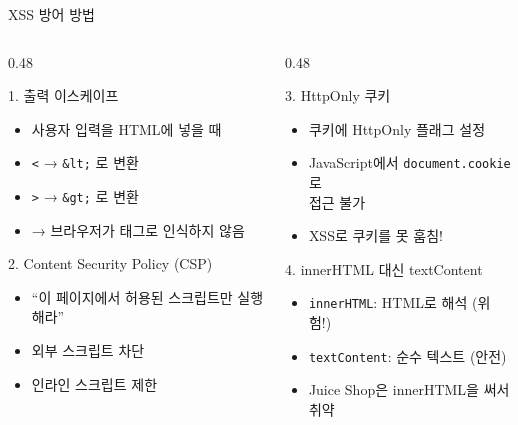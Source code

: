 \documentclass[aspectratio=169,10pt]{beamer}
\begin{document}
\begin{frame}{XSS 방어 방법}

\begin{columns}[T]
\begin{column}{0.48\textwidth}
\begin{block}{1. 출력 이스케이프}
\begin{itemize}
    \item 사용자 입력을 HTML에 넣을 때
    \item \texttt{<} → \texttt{\&lt;} 로 변환
    \item \texttt{>} → \texttt{\&gt;} 로 변환
    \item → 브라우저가 태그로 인식하지 않음
\end{itemize}
\end{block}
\vspace{0.3em}
\begin{block}{2. Content Security Policy (CSP)}
\begin{itemize}
    \item ``이 페이지에서 허용된 스크립트만 실행해라''
    \item 외부 스크립트 차단
    \item 인라인 스크립트 제한
\end{itemize}
\end{block}
\end{column}
\begin{column}{0.48\textwidth}
\begin{block}{3. HttpOnly 쿠키}
\begin{itemize}
    \item 쿠키에 HttpOnly 플래그 설정
    \item JavaScript에서 \texttt{document.cookie}로\\접근 불가
    \item XSS로 쿠키를 못 훔침!
\end{itemize}
\end{block}
\vspace{0.3em}
\begin{block}{4. innerHTML 대신 textContent}
\begin{itemize}
    \item \texttt{innerHTML}: HTML로 해석 (위험!)
    \item \texttt{textContent}: 순수 텍스트 (안전)
    \item Juice Shop은 innerHTML을 써서 취약
\end{itemize}
\end{block}
\end{column}
\end{columns}
\end{frame}
\end{document}
